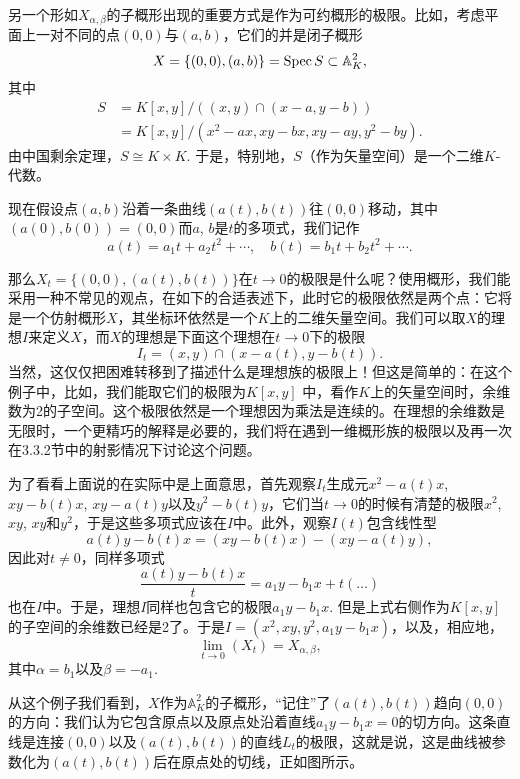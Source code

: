 另一个形如$X_{\alpha,\beta}$的子概形出现的重要方式是作为可约概形的极限。比如，考虑平面上一对不同的点$(0,0)$与$(a,b)$，它们的并是闭子概形
\[
	X=\{(0,0),(a,b)\}=\operatorname{Spec} S\subset \mathbb{A}_K^2,
\]
其中
\[
\begin{aligned}
	S&=K[x,y]/\left((x,y)\cap (x-a,y-b)\right)\\
	&=K[x,y]/(x^2-ax,xy-bx,xy-ay,y^2-by).
\end{aligned}
\]
由中国剩余定理，$S\cong K\times K$. 于是，特别地，$S$（作为矢量空间）是一个二维$K$-代数。

现在假设点$(a,b)$沿着一条曲线$(a(t),b(t))$往$(0,0)$移动，其中$(a(0),b(0))=(0,0)$而$a$, $b$是$t$的多项式，我们记作
\[
	a(t)=a_1t+a_2t^2+\cdots,\quad b(t)=b_1t+b_2t^2+\cdots.
\]


那么$X_t=\{(0,0),(a(t),b(t))\}$在$t\to 0$的极限是什么呢？使用概形，我们能采用一种不常见的观点，在如下的合适表述下，此时它的极限依然是两个点：它将是一个仿射概形$X$，其坐标环依然是一个$K$上的二维矢量空间。我们可以取$X$的理想$I$来定义$X$，而$X$的理想是下面这个理想在$t\to 0$下的极限
\[
	I_t=(x,y)\cap (x-a(t),y-b(t)).
\]
当然，这仅仅把困难转移到了描述什么是理想族的极限上！但这是简单的：在这个例子中，比如，我们能取它们的极限为$K[x,y]$
中，看作$K$上的矢量空间时，余维数为2的子空间。这个极限依然是一个理想因为乘法是连续的。在理想的余维数是无限时，一个更精巧的解释是必要的，我们将在遇到一维概形族的极限以及再一次在3.3.2节中的射影情况下讨论这个问题。

为了看看上面说的在实际中是上面意思，首先观察$I_t$生成元$x^2-a(t)x$, $xy-b(t)x$, $xy-a(t)y$以及$y^2-b(t)y$，它们当$t\to 0$的时候有清楚的极限$x^2$, $xy$, $xy$和$y^2$，于是这些多项式应该在$I$中。此外，观察$I(t)$包含线性型
\[
	a(t)y-b(t)x=(xy-b(t)x)-(xy-a(t)y),
\]
因此对$t\neq 0$，同样多项式
\[
	\frac{a(t)y-b(t)x}{t}=a_1y-b_1x+t(\dots)
\]
也在$I$中。于是，理想$I$同样也包含它的极限$a_1y-b_1x$. 但是上式右侧作为$K[x,y]$的子空间的余维数已经是2了。于是$I=(x^2,xy,y^2,a_1y-b_1x)$，以及，相应地，
\[
	\lim_{t\to 0}(X_t)=X_{\alpha,\beta},
\]
其中$\alpha=b_1$以及$\beta=-a_1$.

从这个例子我们看到，$X$作为$\mathbb{A}_K^2$的子概形，“记住”了$(a(t),b(t))$趋向$(0,0)$的方向：我们认为它包含原点以及原点处沿着直线$a_1y-b_1x=0$的切方向。这条直线是连接$(0,0)$以及$(a(t),b(t))$的直线$L_t$的极限，这就是说，这是曲线被参数化为$(a(t),b(t))$后在原点处的切线，正如图所示。


